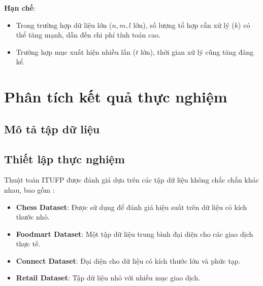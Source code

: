 \documentclass[conference]{IEEEtran}
\begin{document}
\textbf{Hạn chế}:
\begin{itemize}
    \item Trong trường hợp dữ liệu lớn (\(n, m, l\) lớn), số lượng tổ hợp cần xử lý (\(k\)) có thể tăng mạnh, dẫn đến chi phí tính toán cao.
    \item Trường hợp mục xuất hiện nhiều lần (\(t\) lớn), thời gian xử lý cũng tăng đáng kể.
\end{itemize}

\section{Phân tích kết quả thực nghiệm}
\label{sec:experimental_analysis}

\subsection{Mô tả tập dữ liệu}

\begin{table}[H]
\centering
\caption{Thông tin chi tiết các tập dữ liệu sử dụng trong thực nghiệm.}
\label{tab:datasets} 
\end{table}

\subsection{Thiết lập thực nghiệm}
Thuật toán ITUFP được đánh giá dựa trên các tập dữ liệu không chắc chắn khác nhau, bao gồm \cite{spmf}: 
\begin{itemize}
    \item \textbf{Chess Dataset}: Được sử dụng để đánh giá hiệu suất trên dữ liệu có kích thước nhỏ.
    \item \textbf{Foodmart Dataset}: Một tập dữ liệu trung bình đại diện cho các giao dịch thực tế.
    \item \textbf{Connect Dataset}: Đại diện cho dữ liệu có kích thước lớn và phức tạp.
    \item \textbf{Retail Dataset}: Tập dữ liệu nhỏ với nhiều mục giao dịch.
\end{itemize}
\end{document}
